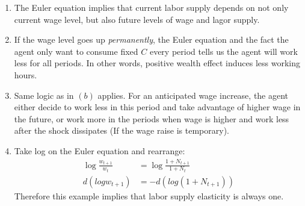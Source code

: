 \documentclass[11pt]{amsart}
\begin{document}
\begin{enumerate}[label=(\alph*)]
    \item The Euler equation implies that current labor supply depends on not only current wage level, but also future levels of wage and lagor supply. 
    \item If the wage level goes up \textit{permanently}, the Euler equation and the fact the agent only want to consume fixed $C$ every period tells us the agent will work less for all periods. In other words, positive wealth effect induces less working hours. 
    \item Same logic as in $(b)$ applies. For an anticipated wage increase, the agent either decide to work less in this period and take advantage of higher wage in the future, or work more in the periods when wage is higher and work less after the shock dissipates (If the wage raise is temporary).
    \item Take log on the Euler equation and rearrange:
    \begin{align*}
    \log \frac{w_{t+1}}{w_t} &= \log \frac{1+N_{t+1}}{1+ N_t} \\
    d (log w_{t+1}) &= -d (log (1+N_{t+1}))
    \end{align*}
    Therefore this example implies that labor supply elasticity is always one. 
\end{enumerate}
\end{document}
